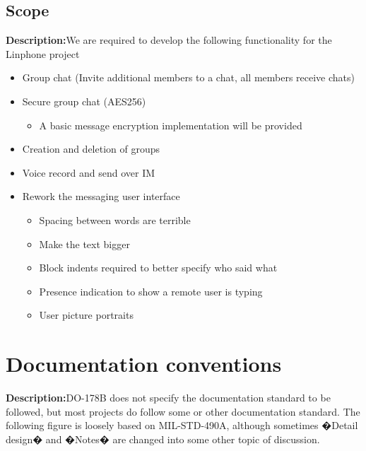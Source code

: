 \documentclass[a4paper]{article}
\begin{document}
\subsection{Scope}
\textbf{Description:}We are required to develop the following functionality for the Linphone project   
 \begin{itemize}
	\item Group chat (Invite additional members to a chat, all members receive chats)
	\item Secure group chat (AES256)
		\begin{itemize}
			\item A basic message encryption implementation will be provided
		\end{itemize}		 
	\item Creation and deletion of groups
	\item Voice record and send over IM
	\item Rework the messaging user interface
		\begin{itemize}
			\item Spacing between words are terrible
			\item Make the text bigger
			\item Block indents required to better specify who said what
			\item Presence indication to show a remote user is typing
			\item User picture portraits
		\end{itemize}		
\end{itemize}
\newpage

\section{Documentation conventions}
\textbf{Description:}DO-178B does not specify the documentation standard to be followed, but most projects do follow some or other documentation standard. The following figure is loosely based on MIL-STD-490A, although sometimes �Detail design� and �Notes� are changed into some other topic of discussion.\\
\end{document}
